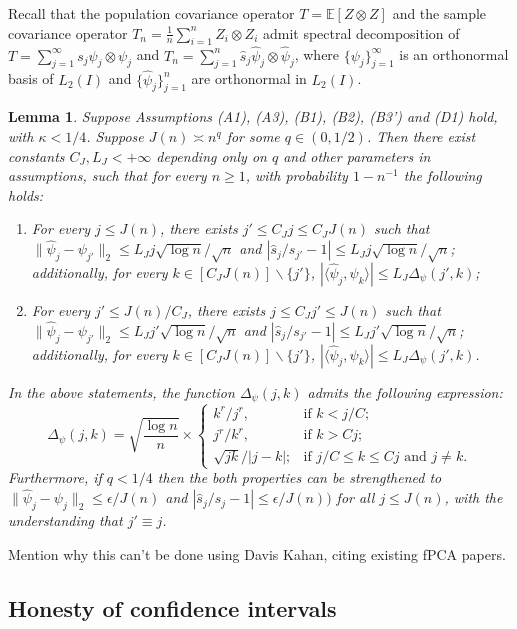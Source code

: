 \documentclass[11pt,a4paper]{article}
\renewcommand{\hat}{\widehat}
\theoremstyle{definition}
\theoremstyle{plain}
\newtheorem{lemma}{Lemma}[section]
\theoremstyle{remark}
\begin{document}
Recall that the population covariance operator $T=\mathbb E[Z\otimes Z]$ and the sample covariance operator $T_n=\frac{1}{n}\sum_{i=1}^nZ_i\otimes Z_i$ admit spectral decomposition of
$T=\sum_{j=1}^{\infty}s_j\psi_j\otimes\psi_j$ and $T_n=\sum_{j=1}^n\hat s_j\hat\psi_j\otimes\hat\psi_j$, where $\{\psi_j\}_{j=1}^{\infty}$ is an orthonormal basis of $L_2(I)$ and $\{\hat\psi_j\}_{j=1}^n$ are orthonormal in $L_2(I)$.
\begin{lemma}
Suppose Assumptions (A1), (A3), (B1), (B2), (B3') and (D1) hold, with $\kappa<1/4$.
Suppose $J(n) \asymp n^{q}$ for some $q\in(0,1/2)$. 
Then there exist constants $C_J,L_J<+\infty$ depending only on $q$ and other parameters in assumptions, such that for every $n\geq 1$, 
with probability $1-n^{-1}$ the following holds:
\begin{enumerate}
\item For every $j\leq J(n)$, there exists $j'\leq C_J j\leq C_JJ(n)$ such that $\|\hat\psi_j-\psi_{j'}\|_2\leq L_J j\sqrt{\log n}/\sqrt{n}$ and $|\hat s_j/s_{j'}-1|\leq L_J j\sqrt{\log n}/\sqrt{n}$;
additionally, for every $k\in[C_J J(n)]\backslash\{j'\}$, $|\langle\hat\psi_j,\psi_k\rangle|\leq L_J\Delta_\psi(j',k)$;
\item For every $j'\leq J(n)/C_J$, there exists $j\leq C_Jj'\leq J(n)$ such that $\|\hat\psi_j-\psi_{j'}\|_2\leq L_J j'\sqrt{\log n}/\sqrt{n}$ and $|\hat s_j/s_{j'}-1|\leq L_J j'\sqrt{\log n}/\sqrt{n}$;
additionally, for every $k\in[C_J J(n)]\backslash\{j'\}$, $|\langle\hat\psi_j,\psi_k\rangle|\leq L_J\Delta_\psi(j',k)$.
\end{enumerate}
In the above statements, the function $\Delta_\psi(j,k)$ admits the following expression:
$$
\Delta_\psi(j,k) = \sqrt{\frac{\log n}{n}}\times \left\{\begin{array}{ll} k^r/j^r,& \text{if }k< j/C;\\ j^r/k^r,& \text{if } k> Cj;\\ \sqrt{jk}/|j-k|;& \text{if $j/C \leq k \leq Cj$ and $j\neq k$.}\end{array}\right.
$$
Furthermore, if $q<1/4$ then the both properties can be strengthened to $\|\hat\psi_j-\psi_j\|_2\leq \epsilon/J(n)$ and $|\hat s_j/s_j-1|\leq \epsilon/J(n))$ for all $j\leq J(n)$,
with the understanding that $j'\equiv j$.
\label{lem:stability}
\end{lemma}

{\color{red} Mention why this can't be done using Davis Kahan, citing existing fPCA papers.}

\subsection{Honesty of confidence intervals}
\end{document}
